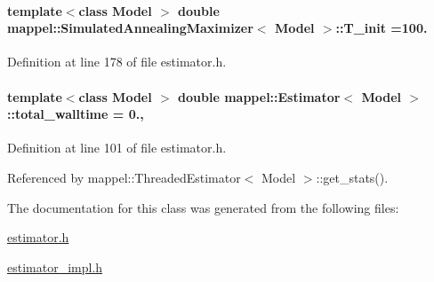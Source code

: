 \paragraph[{\texorpdfstring{T\+\_\+init}{T_init}}]{\setlength{\rightskip}{0pt plus 5cm}template$<$class Model $>$ double {\bf mappel\+::\+Simulated\+Annealing\+Maximizer}$<$ Model $>$\+::T\+\_\+init =100.}\hypertarget{classmappel_1_1SimulatedAnnealingMaximizer_a5a697acb3663ef6aad85157cce00080e}{}\label{classmappel_1_1SimulatedAnnealingMaximizer_a5a697acb3663ef6aad85157cce00080e}


Definition at line 178 of file estimator.\+h.

\paragraph[{\texorpdfstring{total\+\_\+walltime}{total_walltime}}]{\setlength{\rightskip}{0pt plus 5cm}template$<$class Model $>$ double {\bf mappel\+::\+Estimator}$<$ Model $>$\+::total\+\_\+walltime = 0.\hspace{0.3cm}{\ttfamily [protected]}, {\ttfamily [inherited]}}\hypertarget{classmappel_1_1Estimator_a5a408458a111c5222193871fa6bb6644}{}\label{classmappel_1_1Estimator_a5a408458a111c5222193871fa6bb6644}


Definition at line 101 of file estimator.\+h.



Referenced by mappel\+::\+Threaded\+Estimator$<$ Model $>$\+::get\+\_\+stats().



The documentation for this class was generated from the following files\+:\begin{DoxyCompactItemize}
\item 
\hyperlink{estimator_8h}{estimator.\+h}\item 
\hyperlink{estimator__impl_8h}{estimator\+\_\+impl.\+h}\end{DoxyCompactItemize}
